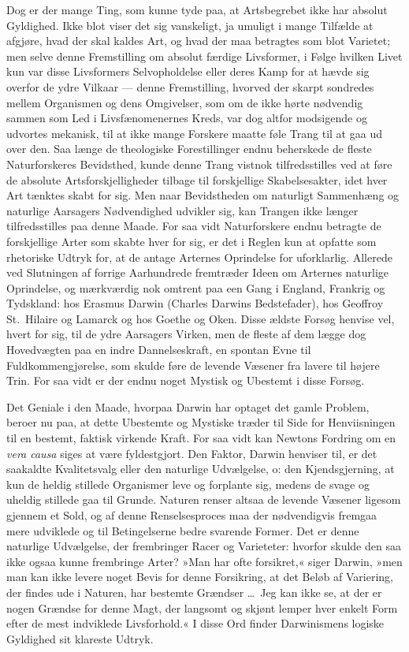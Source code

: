\documentclass[12pt,a4paper]{article}
\begin{document}
Dog er der mange Ting, som kunne tyde paa, at Artsbegrebet ikke har
absolut Gyldighed. Ikke blot viser det sig vanskeligt, ja umuligt i
mange Tilfælde at afgjøre, hvad der skal kaldes Art, og hvad der maa
betragtes som blot Varietet; men selve denne Fremstilling om absolut
færdige Livsformer, i Følge hvilken Livet kun var disse Livsformers
Selvopholdelse eller deres Kamp for at hævde sig overfor de ydre Vilkaar
--- denne Fremstilling, hvorved der skarpt sondredes mellem Organismen og
dens Omgivelser, som om de ikke hørte nødvendig sammen som Led i
Livsfænomenernes Kreds, var dog altfor modsigende og udvortes mekanisk,
til at ikke mange Forskere maatte føle Trang til at gaa ud over den.
Saa længe de theologiske Forestillinger endnu beherskede de fleste
Naturforskeres Bevidsthed, kunde denne Trang vistnok tilfredsstilles ved
at føre de absolute Artsforskjelligheder tilbage til forskjellige
Skabelsesakter, idet hver Art tænktes skabt for sig. Men naar
Bevidstheden om naturligt Sammenhæng og naturlige Aarsagers Nødvendighed
udvikler sig, kan Trangen ikke længer tilfredsstilles paa denne Maade.
For saa vidt Naturforskere endnu betragte de forskjellige Arter som skabte
hver for sig, er det i Reglen kun at opfatte som rhetoriske Udtryk for,
at de antage Arternes Oprindelse for uforklarlig. Allerede ved Slutningen
af forrige Aarhundrede fremtræder Ideen om Arternes naturlige Oprindelse,
og mærkværdig nok omtrent paa een Gang i England, Frankrig og Tydskland:
hos Erasmus Darwin (Charles Darwins Bedstefader), hos Geoffroy
St.\ Hilaire og Lamarck og hos Goethe og Oken. Disse ældste Forsøg
henvise vel, hvert for sig, til de ydre Aarsagers Virken, men de fleste
af dem lægge dog Hovedvægten paa en indre Dannelseskraft, en spontan Evne
til Fuldkommengjørelse, som skulde føre de levende Væsener fra lavere til
højere Trin. For saa vidt er der endnu noget Mystisk og Ubestemt i disse
Forsøg.

Det Geniale i den Maade, hvorpaa Darwin har optaget det gamle Problem,
beroer nu paa, at dette Ubestemte og Mystiske træder til Side for
Henviisningen til en bestemt, faktisk virkende Kraft. For saa vidt kan
Newtons Fordring om en \textit{vera causa} siges at være fyldestgjort.
Den Faktor, Darwin henviser til, er det saakaldte Kvalitetsvalg eller
den naturlige Udvælgelse, o: den Kjendsgjerning, at kun de heldig stillede
Organismer leve og forplante sig, medens de svage og uheldig stillede gaa
til Grunde. Naturen renser altsaa de levende Væsener ligesom gjennem et
Sold, og af denne Renselsesproces maa der nødvendigvis fremgaa mere
udviklede og til Betingelserne bedre svarende Former. Det er denne
naturlige Udvælgelse, der frembringer Racer og Varieteter: hvorfor skulde
den saa ikke ogsaa kunne frembringe Arter? »Man har ofte forsikret,« siger
Darwin, »men man kan ikke levere noget Bevis for denne Forsikring, at det
Beløb af Variering, der findes ude i Naturen, har bestemte Grændser
\ldots\ Jeg kan ikke se, at der er nogen Grændse for denne Magt, der
langsomt og skjønt lemper hver enkelt Form efter de mest indviklede
Livsforhold.« I disse Ord finder Darwinismens logiske Gyldighed sit
klareste Udtryk.
\end{document}

